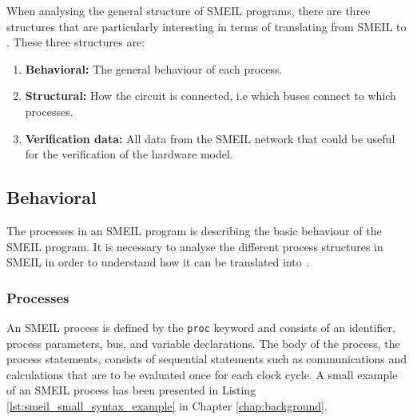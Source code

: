 When analysing the general structure of SMEIL programs, there are three structures that are particularly interesting in terms of translating from SMEIL to \cspm{}. These three structures are:
\begin{enumerate}
    \item \textbf{Behavioral:} The general behaviour of each process.
    \item \textbf{Structural:} How the circuit is connected, i.e which buses connect to which processes.
    \item \textbf{Verification data:} All data from the SMEIL network that could be useful for the verification of the hardware model.
\end{enumerate}
\subsection{Behavioral}
The processes in an SMEIL program is describing the basic behaviour of the SMEIL program. It is necessary to analyse the different process structures in SMEIL in order to understand how it can be translated into \cspm{}.
\subsubsection{Processes}
An SMEIL process is defined by the \texttt{proc} keyword and consists of an identifier, process parameters, bus, and variable declarations. The body of the process, the process statements, consists of sequential statements such as communications and calculations that are to be evaluated once for each clock cycle. A small example of an SMEIL process has been presented in Listing \ref{lst:smeil_small_syntax_example} in Chapter \ref{chap:background}. \\

